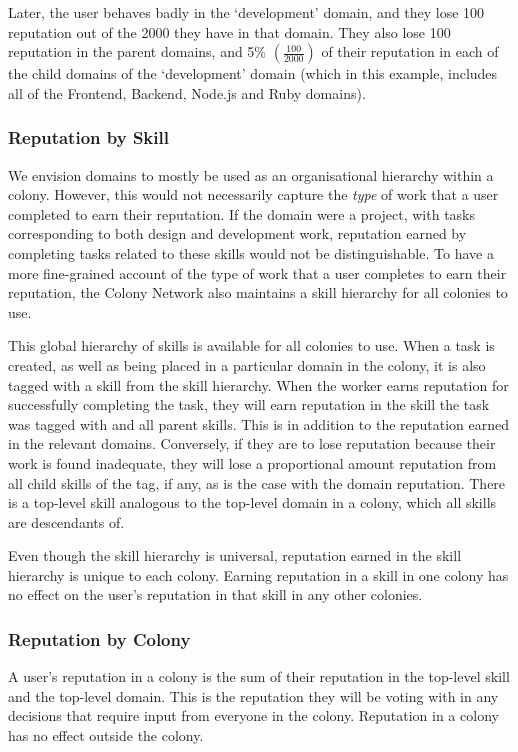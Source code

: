 Later, the user behaves badly in the `development' domain, and they lose 100 reputation out of the 2000 they have in that domain. They also lose 100 reputation in the parent domains, and 5\% $\left(\frac{100}{2000}\right)$ of their reputation in each of the child domains of the `development' domain (which in this example, includes all of the Frontend, Backend, Node.js and Ruby domains). 

\subsubsection{Reputation by Skill}\label{sec:rep-by-skill}

We envision domains to mostly be used as an organisational hierarchy within a colony. However, this would not necessarily capture the \emph{type} of work that a user completed to earn their reputation. If the domain were a project, with tasks corresponding to both design and development work, reputation earned by completing tasks related to these skills would not be distinguishable.  To have a more fine-grained account of the type of work that a user completes to earn their reputation, the Colony Network also maintains a skill hierarchy for all colonies to use.

This global hierarchy of skills is available for all colonies to use. When a task is created, as well as being placed in a particular domain in the colony, it is also tagged with a skill from the skill hierarchy. When the worker earns reputation for successfully completing the task, they will earn reputation in the skill the task was tagged with and all parent skills. This is in addition to the reputation earned in the relevant domains. Conversely, if they are to lose reputation because their work is found inadequate, they will lose a proportional amount reputation from all child skills of the tag, if any, as is the case with the domain reputation. There is a top-level skill analogous to the top-level domain in a colony, which all skills are descendants of.

Even though the skill hierarchy is universal, reputation earned in the skill hierarchy is unique to each colony. Earning reputation in a skill in one colony has no effect on the user's reputation in that skill in any other colonies.

\subsubsection{Reputation by Colony}\label{sec:rep-by-colony}
A user's reputation in a colony is the sum of their reputation in the top-level skill and the top-level domain. This is the reputation they will be voting with in any decisions that require input from everyone in the colony. Reputation in a colony has no effect outside the colony.

